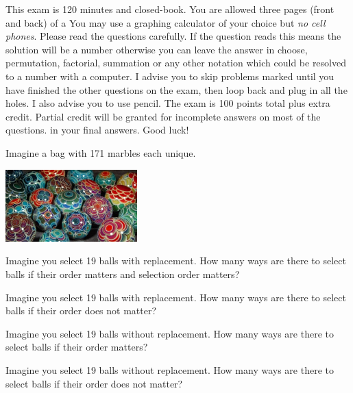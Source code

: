 \documentclass[12pt]{article}
\begin{document}
This exam is 120 minutes and closed-book. You are allowed three pages (front and back) of a  You may use a graphing calculator of your choice but \emph{no cell phones}. Please read the questions carefully. If the question reads  this means the solution will be a number otherwise you can leave the answer in choose, permutation, factorial, summation or any other notation which could be resolved to a number with a computer. I advise you to skip problems marked  until you have finished the other questions on the exam, then loop back and plug in all the holes. I also advise you to use pencil. The exam is 100 points total plus extra credit. Partial credit will be granted for incomplete answers on most of the questions.  in your final answers. Good luck!

\pagebreak

\problem Imagine a bag with 171 marbles each unique. 

\begin{center}
\includegraphics[width=2in]{marbles.jpg}
\end{center}
\benum

 Imagine you select 19 balls with replacement. How many ways are there to select balls if their order matters and selection order matters?  

 Imagine you select 19 balls with replacement. How many ways are there to select balls if their order does not matter?  

 Imagine you select 19 balls without replacement. How many ways are there to select balls if their order matters?  

 Imagine you select 19 balls without replacement. How many ways are there to select balls if their order does not matter? 


\end{document}
